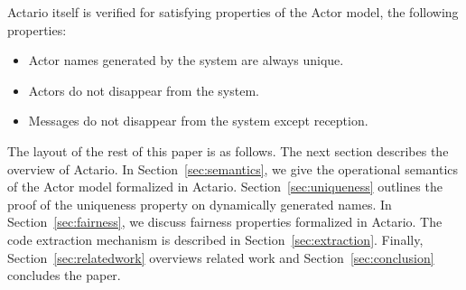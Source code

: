 Actario itself is verified for satisfying properties of the Actor model, the following properties:

\begin{itemize}
\item Actor names generated by the system are always unique.
\item Actors do not disappear from the system.
\item Messages do not disappear from the system except reception.
\end{itemize}





The layout of the rest of this paper is as follows.
The next section describes the overview of Actario.
In Section~\ref{sec:semantics}, we give the operational semantics of the Actor model formalized in Actario.
Section~\ref{sec:uniqueness} outlines the proof of the uniqueness property on dynamically generated names.
In Section~\ref{sec:fairness}, we discuss fairness properties formalized in Actario.
The code extraction mechanism is described in Section~\ref{sec:extraction}.
Finally, Section~\ref{sec:relatedwork} overviews related work and Section~\ref{sec:conclusion} concludes the paper.

